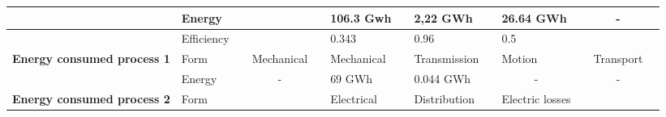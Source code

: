 \begin{table}[]
{\begin{tabular}{|lllllllllllll|}
                                        & Energy                                & \multicolumn{1}{l|}{}            & \multicolumn{1}{l|}{}                  & \multicolumn{1}{l|}{}                & \multicolumn{1}{l|}{106.3 Gwh}    & \multicolumn{1}{l|}{}                & \multicolumn{1}{l|}{2,22 GWh}     & \multicolumn{1}{l|}{}                & \multicolumn{1}{l|}{26.64 GWh}                & \multicolumn{1}{l|}{}                  & \multicolumn{1}{c|}{-}                     &                  \\ \hline
                                        & Efficiency                            & \multicolumn{1}{l|}{}            & \multicolumn{1}{l|}{}                  & \multicolumn{1}{l|}{}                & \multicolumn{1}{l|}{0.343}        & \multicolumn{1}{l|}{}                & \multicolumn{1}{l|}{0.96}         & \multicolumn{1}{l|}{}                & \multicolumn{1}{l|}{0.5}                      & \multicolumn{1}{l|}{}                  & \multicolumn{1}{l|}{}                      &                  \\ \hline
\textbf{Energy consumed process 1}      & Form                                  & \multicolumn{1}{l|}{}            & \multicolumn{1}{l|}{Mechanical}        & \multicolumn{1}{l|}{}                & \multicolumn{1}{l|}{Mechanical}   & \multicolumn{1}{l|}{}                & \multicolumn{1}{l|}{Transmission} & \multicolumn{1}{l|}{}                & \multicolumn{1}{l|}{Motion}                   & \multicolumn{1}{l|}{}                  & \multicolumn{1}{l|}{Transport}             &                  \\ \hline
                                        & Energy                                & \multicolumn{1}{l|}{}            & \multicolumn{1}{c|}{-}                 & \multicolumn{1}{l|}{}                & \multicolumn{1}{l|}{69 GWh}       & \multicolumn{1}{l|}{}                & \multicolumn{1}{l|}{0.044 GWh}    & \multicolumn{1}{l|}{}                & \multicolumn{1}{c|}{-}                        & \multicolumn{1}{l|}{}                  & \multicolumn{1}{c|}{-}                     &                  \\ \hline
\textbf{Energy consumed process 2}      & Form                                  & \multicolumn{1}{l|}{}            & \multicolumn{1}{l|}{}                  & \multicolumn{1}{l|}{}                & \multicolumn{1}{l|}{Electrical}   & \multicolumn{1}{l|}{}                & \multicolumn{1}{l|}{Distribution} & \multicolumn{1}{l|}{}                & \multicolumn{1}{l|}{Electric losses}          & \multicolumn{1}{l|}{}                  & \multicolumn{1}{l|}{}                      &                  \\ \hline

\end{tabular}}
\end{table}
